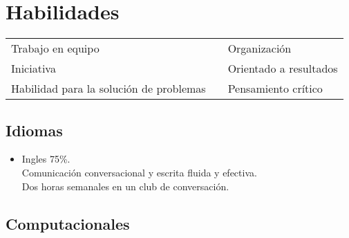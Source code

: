 \documentclass[21pt, onecolumn]{article} %
\begin{document}
\section*{ Habilidades }

\begin{tabular}{ l l l }
Trabajo en equipo  & &  Organización \\
Iniciativa & &  Orientado a resultados \\
Habilidad para la solución de problemas & & Pensamiento crítico   \\
\end{tabular}

\subsection*{ Idiomas }

\begin{itemize}
 \item Ingles  75\%.\\
 Comunicación conversacional y escrita fluida y efectiva.
 \\Dos horas semanales en un club de conversación.
 
\end{itemize}


\subsection*{ Computacionales }
\end{document}
